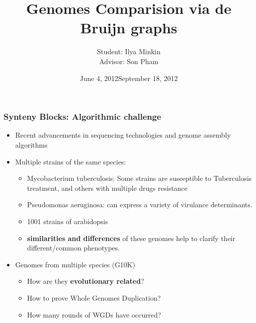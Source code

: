 \documentclass[svgnames,14pt]{beamer}
\title{Genomes Comparision via de Bruijn graphs}
\author{Student: Ilya Minkin \\ Advisor: Son Pham}
\institute{St. Petersburg Academic University}
\date{June 4, 2012}
\begin{document}
\def\braces#1{[#1]}
\newenvironment{changemargin}[2]{%
  \begin{list}{}{%
    \setlength{\topsep}{0pt}%
    \setlength{\leftmargin}{#1}%
    \setlength{\rightmargin}{#2}%
    \setlength{\listparindent}{\parindent}%
    \setlength{\itemindent}{\parindent}%
    \setlength{\parsep}{\parskip}%
  }%
  \item[]}{\end{list}}
\date{September 18, 2012}
\maketitle

\begin{frame}
\frametitle{Synteny Blocks: Algorithmic challenge}
\begin{itemize}
    \item Recent advancements in sequencing technologies and genome assembly algorithms
\item Multiple strains of the same species:
    \begin{itemize}
        \item Mycobacterium tuberculosis: Some strains are susceptible to Tuberculosis treatment, and others with multiple drugs resistance
        \item Pseudomonas aeruginosa: can express a variety of virulance determinants.
         \item 1001 strains of arabidopsis
        \pause
    \item \textbf{similarities and differences} of these genomes help to clarify their different/common phenotypes.
    \end{itemize}
\pause
\item Genomes from multiple species (G10K)
    \begin{itemize}
        \item How are they \textbf{evolutionary related}?
\item How to prove Whole Genomes Duplication?
\item How many rounds of WGDs have occurred?
    \end{itemize}
\end{itemize}
\end{frame}
\end{document}
